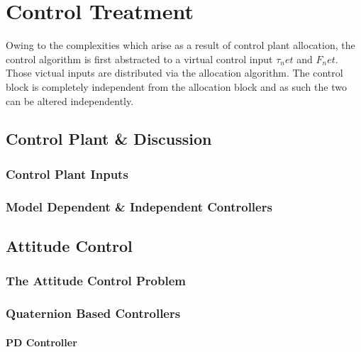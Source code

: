 \chapter{Control Treatment}
\label{ch:control}
Owing to the complexities which arise as a result of control plant allocation, the control algorithm is first abstracted to a virtual control input $\tau_net$ and $F_net$. Those victual inputs are distributed via the allocation algorithm. The control block is completely independent from the allocation block and as such the two can be altered independently.
\section*{Control Plant \& Discussion}
\subsection*{Control Plant Inputs}
\subsection*{Model Dependent \& Independent Controllers}

\section{Attitude Control}
\label{sec:control.attitude}
\subsection{The Attitude Control Problem}
\label{subsec:control.attitude.problem}
\subsection{Quaternion Based Controllers}
\label{subsec:control.attitude.quaternion}
\subsubsection{PD Controller}
